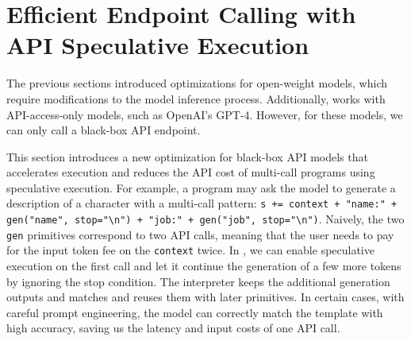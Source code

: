 \section{Efficient Endpoint Calling with API Speculative Execution}
\label{sec:endpoint_speculative}

The previous sections introduced optimizations for open-weight models, which require modifications to the model inference process. Additionally, \lang works with API-access-only models, such as OpenAI's GPT-4. However, for these models, we can only call a black-box API endpoint.

This section introduces a new optimization for black-box API models that accelerates execution and reduces the API cost of multi-call \lang programs using speculative execution. For example, a program may ask the model to generate a description of a character with a multi-call pattern: \texttt{s += context + "name:" + gen("name", stop="\textbackslash n") + "job:" + gen("job", stop="\textbackslash n")}. Naively, the two \texttt{gen} primitives correspond to two API calls, meaning that the user needs to pay for the input token fee on the \texttt{context} twice.
In \lang, we can enable speculative execution on the first call and let it continue the generation of a few more tokens by ignoring the stop condition.
The interpreter keeps the additional generation outputs and matches and reuses them with later primitives.
In certain cases, with careful prompt engineering, the model can correctly match the template with high accuracy, saving us the latency and input costs of one API call.


